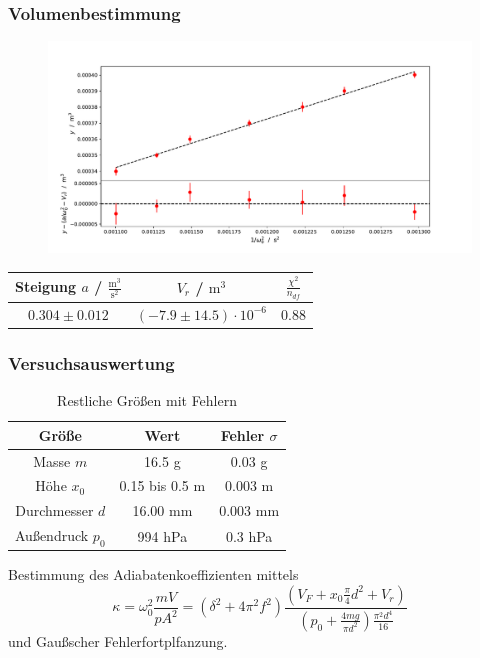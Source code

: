 \documentclass{beamer}
\begin{document}
\begin{frame}
\frametitle{Volumenbestimmung}

\begin{figure}
\centering
\includegraphics[width=0.9\linewidth]{plots/regression_kleine.pdf}
\end{figure}

\begin{table}
\begin{tabular}{|c|c|c|}
\hline
Steigung $a$ / $\frac{\mathrm m^3}{\mathrm s^2}$ & $V_r$ / $\mathrm m^3$ & $\frac{\chi^2}{n_{df}}$ \\
\hline
$0.304 \pm 0.012$ & $(-7.9 \pm 14.5) \cdot 10^{-6}$ & 0.88 \\
\hline
\end{tabular}
\end{table}

\end{frame}


\begin{frame}
\frametitle{Versuchsauswertung}

\begin{table}
\begin{tabular}{|c|c|c|}
\hline
Größe & Wert & Fehler $\sigma$ \\
\hline
Masse $m$ & 16.5 g & 0.03 g \\
\hline
Höhe $x_0$ & 0.15 bis 0.5 m & 0.003 m \\
\hline
Durchmesser $d$ & 16.00 mm & 0.003 mm \\
\hline
Außendruck $p_0$ & 994 hPa & 0.3 hPa \\
\hline
\end{tabular}
\caption{Restliche Größen mit Fehlern}
\end{table}
Bestimmung des Adiabatenkoeffizienten mittels
$$\kappa = \omega_0^2\frac{mV}{pA^2} = (\delta^2 + 4\pi^2 f^2) \frac{(V_F+x_0\frac{\pi}4 d^2 + V_r)}{(p_0+\frac{4mg}{\pi d^2})\frac{\pi^2d^4}{16}}$$
und Gaußscher Fehlerfortplfanzung.
\end{frame}
\end{document}
